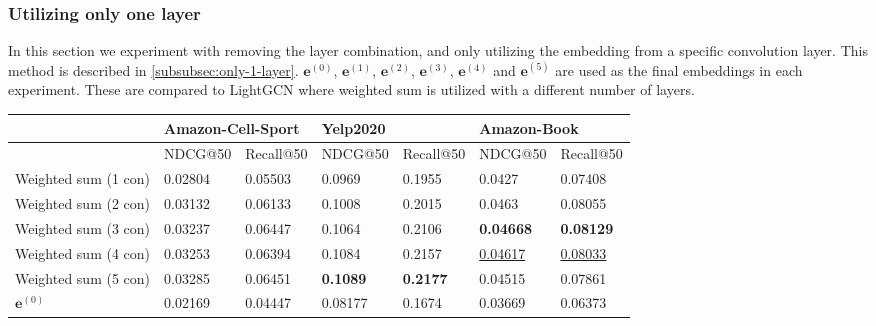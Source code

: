 \subsubsection{Utilizing only one layer}
In this section we experiment with removing the layer combination, and only utilizing the embedding from a specific convolution layer.
This method is described in \autoref{subsubsec:only-1-layer}.
$\mathbf{e}^{(0)}$, $\mathbf{e}^{(1)}$, $\mathbf{e}^{(2)}$, $\mathbf{e}^{(3)}$, $\mathbf{e}^{(4)}$ and $\mathbf{e}^{(5)}$ are used as the final embeddings in each experiment.
These are compared to LightGCN where weighted sum is utilized with a different number of layers.
\begin{table}[]
    \centering
    \begin{tabular}{|l|l|l|l|l|l|l|}
        \hline
                             & \multicolumn{2}{l|}{Amazon-Cell-Sport} & \multicolumn{2}{l|}{Yelp2020} & \multicolumn{2}{l|}{Amazon-Book}                                                                 \\ \hline
                             & NDCG@50                                & Recall@50                     & NDCG@50                          & Recall@50         & NDCG@50             & Recall@50           \\ \hline
        Weighted sum (1 con) & 0.02804                                & 0.05503                       & 0.0969                           & 0.1955            & 0.0427              & 0.07408             \\ \hline
        Weighted sum (2 con) & 0.03132                                & 0.06133                       & 0.1008                           & 0.2015            & 0.0463              & 0.08055             \\ \hline
        Weighted sum (3 con) & 0.03237                                & 0.06447                       & 0.1064                           & 0.2106            & \textbf{0.04668}    & \textbf{0.08129}    \\ \hline
        Weighted sum (4 con) & 0.03253                                & 0.06394                       & 0.1084                           & 0.2157            & \underline{0.04617} & \underline{0.08033} \\ \hline
        Weighted sum (5 con) & 0.03285                                & 0.06451                       & \textbf{0.1089}                  & \textbf{0.2177}   & 0.04515             & 0.07861             \\ \hline
        $\mathbf{e}^{(0)}$   & 0.02169                                & 0.04447                       & 0.08177                          & 0.1674            & 0.03669             & 0.06373             \\ \hline

\end{tabular}
\end{table}
